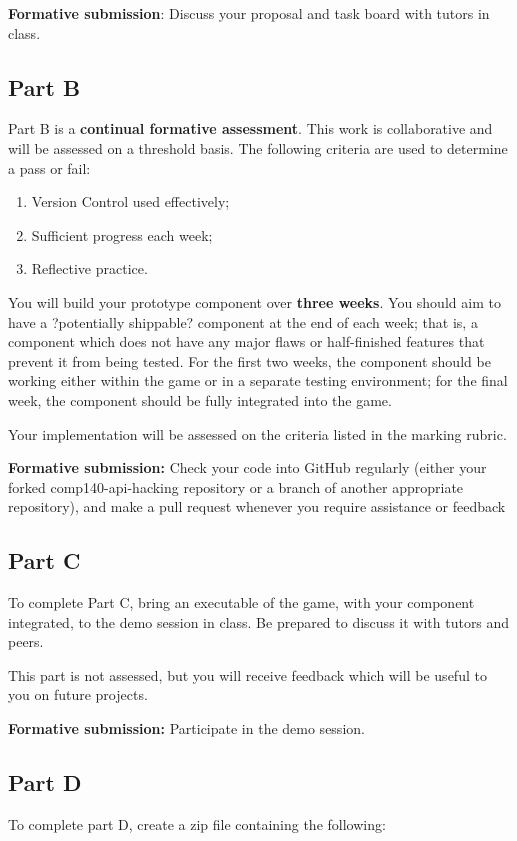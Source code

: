 \documentclass{../fal_assignment}
\begin{document}
\textbf{Formative submission}: Discuss your proposal and task board with tutors in class.

\subsection*{Part B}

Part B is a \textbf{continual formative assessment}. This work is collaborative and will be assessed on a threshold basis. The following criteria are used to determine a pass or fail:

\begin{enumerate}[label=(\alph*)]
	\item Version Control used effectively;
	\item Sufficient progress each week;
	\item Reflective practice.
\end{enumerate}

You will build your prototype component over \textbf{three weeks}. You should aim to have a ?potentially shippable? component at the end of each week; that is, a component which does not have any major flaws or half-finished features that prevent it from being tested. For the first two weeks, the component should be working either within the game or in a separate testing environment; for the final week, the component should be fully integrated into the game. 

Your implementation will be assessed on the criteria listed in the marking rubric. 

\textbf{Formative submission: }Check your code into GitHub regularly (either your forked comp140-api-hacking repository or a branch of another appropriate repository), and make a pull request whenever you require assistance or feedback

\subsection*{Part C}

To complete Part C, bring an executable of the game, with your component integrated, to the demo session in class. Be prepared to discuss it with tutors and peers. 

This part is not assessed, but you will receive feedback which will be useful to you on future projects.

\textbf{Formative submission:} Participate in the demo session.

\subsection*{Part D}
To complete part D, create a zip file containing the following: 
\end{document}
